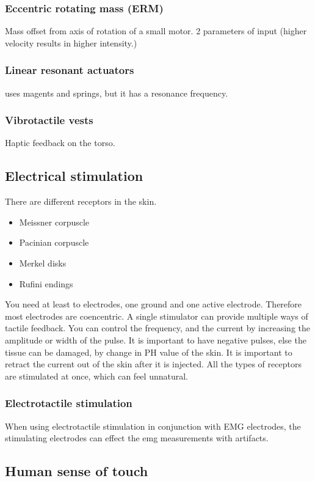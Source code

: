 \documentclass[a4paper]{article}
\begin{document}
\subsubsection{Eccentric rotating mass (ERM)}
Mass offset from axis of rotation of a small motor. 2 parameters of input (higher velocity results in higher intensity.) 

\subsubsection{Linear resonant actuators}
uses magents and springs, but it has a resonance frequency. 

\subsubsection{Vibrotactile vests}
Haptic feedback on the torso.


\subsection{Electrical stimulation}
There are different receptors in the skin. 
\begin{itemize}
	\item Meissner corpuscle
	\item Pacinian corpuscle
	\item Merkel disks
	\item Rufini endings
\end{itemize}

You need at least to electrodes, one ground and one active electrode. Therefore most electrodes are coencentric. A single stimulator can provide multiple ways of tactile feedback. You can control the frequency, and the current by increasing the amplitude or width of the pulse. It is important to have negative pulses, else the tissue can be damaged, by change in PH value of the skin. It is important to retract the current out of the skin after it is injected. All the types of receptors are stimulated at once, which can feel unnatural.

\subsubsection{Electrotactile stimulation}
When using electrotactile stimulation in conjunction with EMG electrodes, the stimulating electrodes can effect the emg measurements with artifacts. 


\subsection{Human sense of touch}
\end{document}
